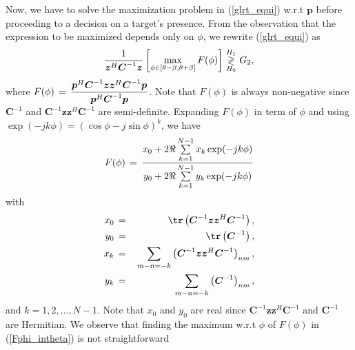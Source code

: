 \indent
Now, we have to solve the maximization problem in (\ref{glrt_equi})
w.r.t $\boldsymbol{p}$ before proceeding to a decision on a target's presence.
From the observation that the expression to be maximized
depends only on $\phi$,
we rewrite (\ref{glrt_equi}) as
\begin{equation}\label{glrt_Fphi}
\frac{1}{\boldsymbol{z}^H \boldsymbol{C}^{-1} \boldsymbol{z}}
\left [
\max \limits_{\phi \in [\theta - \beta,\theta + \beta]}F(\phi)
\right ]
   \thinspace\mathop{\gtrless}_{H_0}^{H_1}\thinspace G_2,
\end{equation}
where
$
F(\phi) \thinspace = \thinspace
                          \dfrac{\boldsymbol{p}^H \boldsymbol{C}^{-1}\boldsymbol{z}\boldsymbol{z}^H \boldsymbol{C}^{-1}\boldsymbol{p}}
                          {\boldsymbol{p}^H \boldsymbol{C}^{-1} \boldsymbol{p}}
$.
Note that $F(\phi)$ is always non-negative since
$\boldsymbol{C}^{-1}$
and
$\boldsymbol{C}^{-1}\boldsymbol{z}\boldsymbol{z}^H \boldsymbol{C}^{-1}$
 are semi-definite.
Expanding
$F(\phi)$ in term of $\phi$ and using
$\exp (-j k \phi) = \left (\cos{\phi} - j \sin{\phi}\right )^k$, we have
\begin{equation}\label{Fphi_intheta}
F(\phi) \thinspace = \thinspace  \frac
           {x_0 + 2 \Re \sum \limits_{k=1}^{N-1} x_k \exp(-jk\phi) }
           {y_0 + 2\Re \sum \limits_{k=1}^{N-1} y_k \exp(-jk\phi) }
\end{equation}
with
\begin{eqnarray}
    x_0 \thinspace &=& \thinspace \tr \left(\boldsymbol{C}^{-1}\boldsymbol{z}\boldsymbol{z}^{H}\boldsymbol{C}^{-1}\right), \label{x0_poly} \\
 y_0 \thinspace &=& \thinspace \tr \left(\boldsymbol{C}^{-1}\right), \\
  x_k \thinspace &=& \thinspace \sum\limits_{m-n=-k} \left(\boldsymbol{C}^{-1}\boldsymbol{z}\boldsymbol{z}^{H}\boldsymbol{C}^{-1}\right)_{nm}, \\
  y_k \thinspace &=& \thinspace \sum\limits_{m-n=-k} \left (\boldsymbol{C}^{-1}\right)_{nm},\label{yk_poly}
\end{eqnarray}
and $k= 1,2,\ldots,N-1$.
 Note that $x_0$ and $y_0$ are real since
$ \boldsymbol{C}^{-1}\boldsymbol{z}\boldsymbol{z}^{H}\boldsymbol{C}^{-1} $ and
$\boldsymbol{C}^{-1}$
are Hermitian.
We observe that
finding the maximum w.r.t $\phi$ of $F(\phi)$ in (\ref{Fphi_intheta}) is not straightforward
